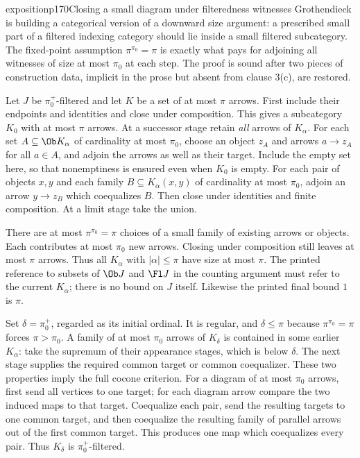 \begin{dcomment}{exposition}{p170}{Closing a small diagram under filteredness witnesses}
Grothendieck is building a categorical version of a downward size argument: a prescribed small part of a filtered indexing category should lie inside a small filtered subcategory. The fixed-point assumption $\pi^{\pi_0}=\pi$ is exactly what pays for adjoining all witnesses of size at most $\pi_0$ at each step. The proof is sound after two pieces of construction data, implicit in the prose but absent from clause 3(c), are restored.

Let $J$ be $\pi_0^+$-filtered and let $K$ be a set of at most $\pi$ arrows. First include their endpoints and identities and close under composition. This gives a subcategory $K_0$ with at most $\pi$ arrows. At a successor stage retain \emph{all} arrows of $K_\alpha$. For each set $A\subseteq\Ob K_\alpha$ of cardinality at most $\pi_0$, choose an object $z_A$ and arrows $a\to z_A$ for all $a\in A$, and adjoin the arrows as well as their target. Include the empty set here, so that nonemptiness is ensured even when $K_0$ is empty. For each pair of objects $x,y$ and each family $B\subseteq K_\alpha(x,y)$ of cardinality at most $\pi_0$, adjoin an arrow $y\to z_B$ which coequalizes $B$. Then close under identities and finite composition. At a limit stage take the union.

There are at most $\pi^{\pi_0}=\pi$ choices of a small family of existing arrows or objects. Each contributes at most $\pi_0$ new arrows. Closing under composition still leaves at most $\pi$ arrows. Thus all $K_\alpha$ with $|\alpha|\leq\pi$ have size at most $\pi$. The printed reference to subsets of $\Ob J$ and $\Fl J$ in the counting argument must refer to the current $K_\alpha$; there is no bound on $J$ itself. Likewise the printed final bound $1$ is $\pi$.

Set $\delta=\pi_0^+$, regarded as its initial ordinal. It is regular, and $\delta\leq\pi$ because $\pi^{\pi_0}=\pi$ forces $\pi>\pi_0$. A family of at most $\pi_0$ arrows of $K_\delta$ is contained in some earlier $K_\alpha$: take the supremum of their appearance stages, which is below $\delta$. The next stage supplies the required common target or common coequalizer. These two properties imply the full cocone criterion. For a diagram of at most $\pi_0$ arrows, first send all vertices to one target; for each diagram arrow compare the two induced maps to that target. Coequalize each pair, send the resulting targets to one common target, and then coequalize the resulting family of parallel arrows out of the first common target. This produces one map which coequalizes every pair. Thus $K_\delta$ is $\pi_0^+$-filtered.


\end{dcomment}

